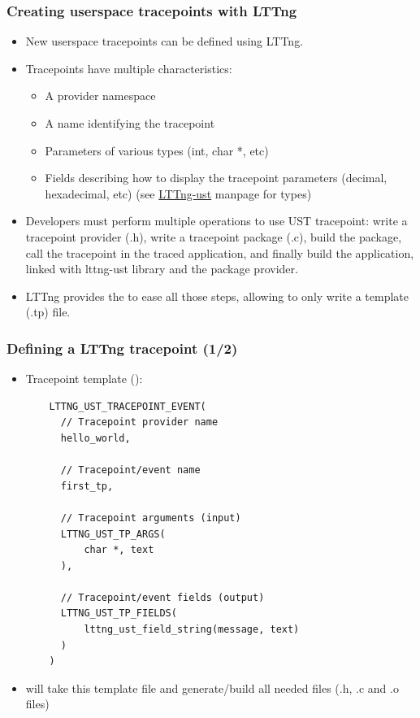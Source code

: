 \begin{frame}
  \frametitle{Creating userspace tracepoints with LTTng}
  \begin{itemize}
    \item New userspace tracepoints can be defined using LTTng.
    \item Tracepoints have multiple characteristics:
    \begin{itemize}
      \item A provider namespace
      \item A name identifying the tracepoint
      \item Parameters of various types (int, char *, etc)
      \item Fields describing how to display the tracepoint parameters
            (decimal, hexadecimal, etc) (see \href{https://lttng.org/man/3/lttng-ust/v2.13/}{LTTng-ust} manpage
            for types)
    \end{itemize}
    \item Developers must perform multiple operations to use UST tracepoint:
    write a tracepoint provider (.h), write a tracepoint package (.c), build
    the package, call the tracepoint in the traced application, and finally
    build the application, linked with lttng-ust library and the package provider.
    \item LTTng provides the  to ease all those steps,
    allowing to only write a template (.tp) file.
  \end{itemize}
\end{frame}

\begin{frame}[fragile]
  \frametitle{Defining a LTTng tracepoint (1/2)}

  \begin{itemize}
    \item Tracepoint template ():
    \begin{block}{}
      \begin{verbatim}
    LTTNG_UST_TRACEPOINT_EVENT(
      // Tracepoint provider name
      hello_world,

      // Tracepoint/event name
      first_tp,

      // Tracepoint arguments (input)
      LTTNG_UST_TP_ARGS(
          char *, text
      ),

      // Tracepoint/event fields (output)
      LTTNG_UST_TP_FIELDS(
          lttng_ust_field_string(message, text)
      )
    )
     \end{verbatim}
    \end{block}
    \item {} will take this template file and generate/build
    all needed files (.h, .c and .o files)
  \end{itemize}
\end{frame}

